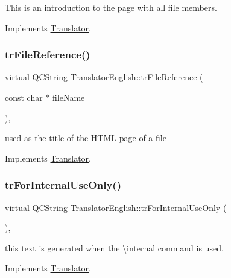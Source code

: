 This is an introduction to the page with all file members. 

Implements \mbox{\hyperlink{class_translator}{Translator}}.

\mbox{\label{class_translator_english_ae3de7520ae3e41d67b14d56919ce8d3c}} 
\subsubsection{\texorpdfstring{trFileReference()}{trFileReference()}}
{\footnotesize\ttfamily virtual \mbox{\hyperlink{class_q_c_string}{Q\+C\+String}} Translator\+English\+::tr\+File\+Reference (\begin{DoxyParamCaption}\item[{const char $\ast$}]{file\+Name }\end{DoxyParamCaption})\hspace{0.3cm}{\ttfamily [inline]}, {\ttfamily [virtual]}}

used as the title of the H\+T\+ML page of a file 

Implements \mbox{\hyperlink{class_translator}{Translator}}.

\mbox{\label{class_translator_english_a62f774936922cabadf63443e542ad470}} 
\subsubsection{\texorpdfstring{trForInternalUseOnly()}{trForInternalUseOnly()}}
{\footnotesize\ttfamily virtual \mbox{\hyperlink{class_q_c_string}{Q\+C\+String}} Translator\+English\+::tr\+For\+Internal\+Use\+Only (\begin{DoxyParamCaption}{ }\end{DoxyParamCaption})\hspace{0.3cm}{\ttfamily [inline]}, {\ttfamily [virtual]}}

this text is generated when the \textbackslash{}internal command is used. 

Implements \mbox{\hyperlink{class_translator}{Translator}}.

\mbox{\label{class_translator_english_abc16622332f0de377a9cc374164883c9}} 
